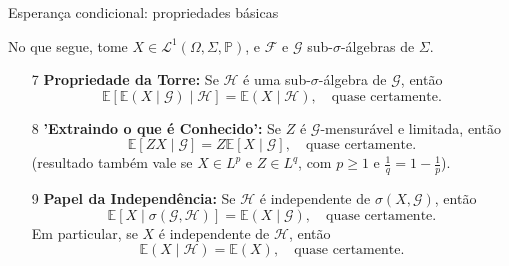 \documentclass[11pt]{beamer}
\begin{document}
	
		\begin{frame}{Esperança condicional: propriedades básicas}
		
		No que segue, tome $X \in \mathcal{L}^1(\Omega,\Sigma,\mathbb{P})$, e $\mathcal{F}$ e $\mathcal{G}$ sub-$\sigma$-álgebras de $\Sigma$.
		\begin{lemma}
			\begin{enumerate}
			\item[7] \textbf{Propriedade da Torre:}  
			Se \( \mathcal{H} \) é uma sub-\(\sigma\)-álgebra de \( \mathcal{G} \), então
			\[
			\mathbb{E}[\mathbb{E}(X \mid \mathcal{G}) \mid \mathcal{H}] = \mathbb{E}(X \mid \mathcal{H}), \quad \text{quase certamente}.
			\]
			
			\item[8] \textbf{'Extraindo o que é Conhecido':}  
			Se \( Z \) é \( \mathcal{G} \)-mensurável e limitada, então
			\[
			\mathbb{E}[ZX \mid \mathcal{G}] = Z \mathbb{E}[X \mid \mathcal{G}], \quad \text{quase certamente}.
			\]
				(resultado também vale se $X\in L^p$ e $Z \in L^q$, com $p\geq1$ e $\frac{1}{q} = 1-\frac{1}{p}$).
			
			\item[9] \textbf{Papel da Independência:}  
			Se \( \mathcal{H} \) é independente de \( \sigma(X, \mathcal{G}) \), então
			\[
			\mathbb{E}[X \mid \sigma(\mathcal{G}, \mathcal{H})] = \mathbb{E}(X \mid \mathcal{G}), \quad \text{quase certamente}.
			\]
			Em particular, se \( X \) é independente de \( \mathcal{H} \), então
			\[
			\mathbb{E}(X \mid \mathcal{H}) = \mathbb{E}(X), \quad \text{quase certamente}.
			\]
			\end{enumerate}
		\end{lemma}
		
		
		
	\end{frame}
	
\end{document}
